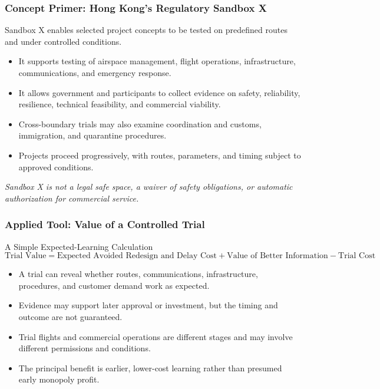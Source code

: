 \documentclass{beamer}
\begin{document}
\begin{frame}[t]
\frametitle{Concept Primer: Hong Kong's Regulatory Sandbox X}
Sandbox X enables selected project concepts to be tested on predefined routes and under controlled conditions.
\begin{itemize}
\item It supports testing of airspace management, flight operations, infrastructure, communications, and emergency response.
\item It allows government and participants to collect evidence on safety, reliability, resilience, technical feasibility, and commercial viability.
\item Cross-boundary trials may also examine coordination and customs, immigration, and quarantine procedures.
\item Projects proceed progressively, with routes, parameters, and timing subject to approved conditions.
\end{itemize}
\textit{Sandbox X is not a legal safe space, a waiver of safety obligations, or automatic authorization for commercial service.}
\end{frame}
\begin{frame}[t]
\frametitle{Applied Tool: Value of a Controlled Trial}
\begin{block}{A Simple Expected-Learning Calculation}
\[
\text{Trial Value}
=
\text{Expected Avoided Redesign and Delay Cost}
+\text{Value of Better Information}
-\text{Trial Cost}
\]
\end{block}
\begin{itemize}
\item A trial can reveal whether routes, communications, infrastructure, procedures, and customer demand work as expected.
\item Evidence may support later approval or investment, but the timing and outcome are not guaranteed.
\item Trial flights and commercial operations are different stages and may involve different permissions and conditions.
\item The principal benefit is earlier, lower-cost learning rather than presumed early monopoly profit.
\end{itemize}
\end{frame}
\end{document}
